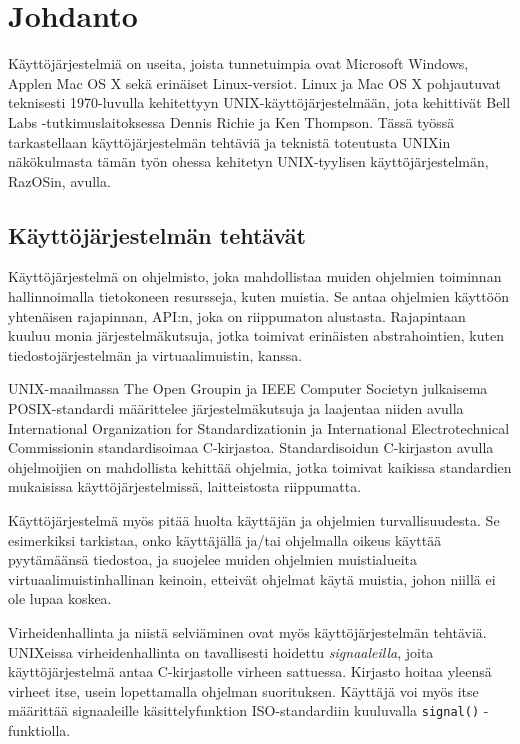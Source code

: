 \chapter{Johdanto}
\label{Johdanto}

Käyttöjärjestelmiä on useita, joista tunnetuimpia ovat Microsoft Windows, Applen Mac OS X sekä erinäiset Linux-versiot. Linux ja Mac OS X pohjautuvat teknisesti 1970-luvulla kehitettyyn UNIX-käyttöjärjestelmään, jota kehittivät Bell Labs -tutkimuslaitoksessa Dennis Richie ja Ken Thompson. Tässä työssä tarkastellaan käyttöjärjestelmän tehtäviä ja teknistä toteutusta UNIXin näkökulmasta tämän työn ohessa kehitetyn UNIX-tyylisen käyttöjärjestelmän, RazOSin, avulla.

\section{Käyttöjärjestelmän tehtävät}
Käyttöjärjestelmä on ohjelmisto, joka mahdollistaa muiden ohjelmien toiminnan hallinnoimalla tietokoneen resursseja, kuten muistia. Se antaa ohjelmien käyttöön yhtenäisen rajapinnan, API:n, joka on riippumaton alustasta. Rajapintaan kuuluu monia järjestelmäkutsuja, jotka toimivat erinäisten abstrahointien, kuten tiedostojärjestelmän ja virtuaalimuistin, kanssa.

\par

UNIX-maailmassa The Open Groupin ja IEEE Computer Societyn julkaisema POSIX-standardi määrittelee järjestelmäkutsuja ja laajentaa niiden avulla International Organization for Standardizationin ja International Electrotechnical Commissionin standardisoimaa C-kirjastoa. Standardisoidun C-kirjaston avulla ohjelmoijien on mahdollista kehittää ohjelmia, jotka toimivat kaikissa standardien mukaisissa käyttöjärjestelmissä, laitteistosta riippumatta.

\par

Käyttöjärjestelmä myös pitää huolta käyttäjän ja ohjelmien turvallisuudesta. Se esimerkiksi tarkistaa, onko käyttäjällä ja/tai ohjelmalla oikeus käyttää pyytämäänsä tiedostoa, ja suojelee muiden ohjelmien muistialueita virtuaalimuistinhallinan keinoin, etteivät ohjelmat käytä muistia, johon niillä ei ole lupaa koskea.

\par

Virheidenhallinta ja niistä selviäminen ovat myös käyttöjärjestelmän tehtäviä. UNIXeissa virheidenhallinta on tavallisesti hoidettu \textit{signaaleilla}, joita käyttöjärjestelmä antaa C-kirjastolle virheen sattuessa. Kirjasto hoitaa yleensä virheet itse, usein lopettamalla ohjelman suorituksen. Käyttäjä voi myös itse määrittää signaaleille käsittelyfunktion ISO-standardiin kuuluvalla \texttt{signal()} -funktiolla.